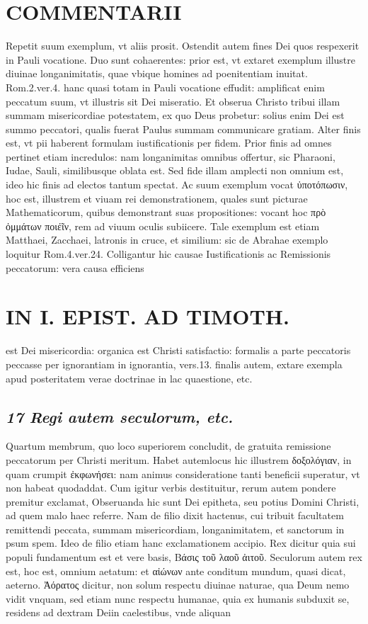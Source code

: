 \documentclass{article}
\begin{document}
\begin{pages}
\section*{COMMENTARII }
\marginpar{[ p.36 ]}\pstart Repetit suum exemplum, vt aliis prosit. Ostendit autem fines Dei quos respexerit in Pauli vocatione. Duo sunt cohaerentes: prior est, vt extaret exemplum illustre diuinae longanimitatis, quae vbique homines ad poenitentiam inuitat. Rom.2.ver.4. hanc quasi totam in Pauli vocatione effudit: amplificat enim peccatum suum, vt illustris sit Dei miseratio. Et obserua Christo tribui illam summam misericordiae potestatem, ex quo Deus probetur: solius enim Dei est summo peccatori, qualis fuerat Paulus summam communicare gratiam. Alter finis est, vt pii haberent formulam iustificationis per fidem. Prior finis ad omnes pertinet etiam incredulos: nam longanimitas omnibus offertur, sic Pharaoni, Iudae, Sauli, similibusque oblata est. Sed fide illam amplecti non omnium est, ideo hic finis ad electos tantum spectat. Ac suum exemplum vocat ὐποτόπωσιν, hoc est, illustrem et viuam rei demonstrationem, quales sunt picturae Mathematicorum, quibus demonstrant suas propositiones: vocant hoc πρὸ ὀμμάτων ποιέῖν, rem ad viuum oculis subiicere. Tale exemplum est etiam Matthaei, Zacchaei, latronis in cruce, et similium: sic de Abrahae exemplo loquitur Rom.4.ver.24. Colligantur hic causae Iustificationis ac Re\pend\pstart missionis peccatorum: vera causa efficiens  \pend
\section*{IN I. EPIST. AD TIMOTH. }
\marginpar{[ p.37 ]}\pstart est Dei misericordia: organica est Christi satisfactio: formalis a parte peccatoris peccasse per ignorantiam in ignorantia, vers.13. finalis autem, extare exempla apud posteritatem verae doctrinae in lac quaestione, etc.  \pend
{}
{}
\subsection*{\textit{17 Regi autem seculorum, etc. }}\pstart Quartum membrum, quo loco superiorem concludit, de gratuita remissione peccatorum per Christi meritum. Habet autemlocus hic illustrem δοξολόγιαν, in quam crumpit ἐκφωνήσει: nam animus consideratione tanti beneficii superatur, vt non habeat quodaddat. Cum igitur verbis destituitur, rerum autem pondere premitur exclamat, Obseruanda hic sunt Dei epitheta, seu potius Domini Christi, ad quem malo haec referre. Nam de filio dixit hactenus, cui tribuit facultatem remittendi peccata, summam misericordiam, longanimitatem, et sanctorum in psum spem. Ideo de filio etiam hanc exclamationem accipio. Rex dicitur quia sui populi fundamentum est et vere basis, Βάσις τοῦ λαοῦ ἀιτοῦ. Seculorum autem rex est, hoc est, omnium aetatum: et αἰώνων ante conditum mundum, quasi dicat, aeterno. Ἀόρατος dicitur, non solum respectu diuinae naturae, qua Deum nemo vidit vnquam, sed etiam nunc respectu humanae, quia ex humanis subduxit se, residens ad dextram Deiin caelestibus, vnde aliquan\pend

\end{pages}
\end{document}
